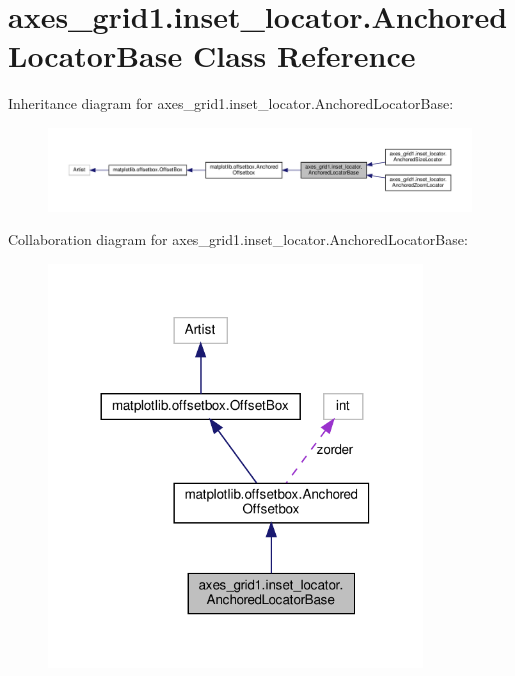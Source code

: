 \hypertarget{classaxes__grid1_1_1inset__locator_1_1AnchoredLocatorBase}{}\section{axes\+\_\+grid1.\+inset\+\_\+locator.\+Anchored\+Locator\+Base Class Reference}
\label{classaxes__grid1_1_1inset__locator_1_1AnchoredLocatorBase}


Inheritance diagram for axes\+\_\+grid1.\+inset\+\_\+locator.\+Anchored\+Locator\+Base\+:
\nopagebreak
\begin{figure}[H]
\begin{center}
\leavevmode
\includegraphics[width=350pt]{classaxes__grid1_1_1inset__locator_1_1AnchoredLocatorBase__inherit__graph}
\end{center}
\end{figure}


Collaboration diagram for axes\+\_\+grid1.\+inset\+\_\+locator.\+Anchored\+Locator\+Base\+:
\nopagebreak
\begin{figure}[H]
\begin{center}
\leavevmode
\includegraphics[width=281pt]{classaxes__grid1_1_1inset__locator_1_1AnchoredLocatorBase__coll__graph}
\end{center}
\end{figure}
